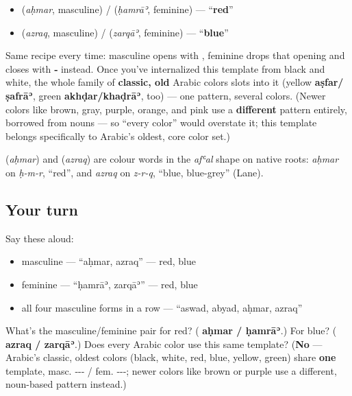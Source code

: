 \begin{grammarlens}[title={Grammar Lens — The pattern holds}]
\begin{itemize}
\raggedright
  \item \textbf{} (\emph{aḥmar}, masculine) / \textbf{} (\emph{ḥamrāʾ}, feminine) — \textquotedblleft{}\textbf{red}\textquotedblright{}
  \item \textbf{} (\emph{azraq}, masculine) / \textbf{} (\emph{zarqāʾ}, feminine) — \textquotedblleft{}\textbf{blue}\textquotedblright{}
\end{itemize}

Same recipe every time: masculine opens with \textbf{}, feminine drops that opening and closes with \textbf{‑} instead. Once you've internalized this template from black and white, the whole family of \textbf{classic, old} Arabic colors slots into it (yellow \textbf{aṣfar/ṣafrāʾ}, green \textbf{akhḍar/khaḍrāʾ}, too) — one pattern, several colors. (Newer colors like brown, gray, purple, orange, and pink use a \textbf{different} pattern entirely, borrowed from nouns — so \textquotedblleft{}every color\textquotedblright{} would overstate it; this template belongs specifically to Arabic's oldest, core color set.)
\end{grammarlens}

\begin{cousinweb}
\textbf{} (\emph{aḥmar}) and \textbf{} (\emph{azraq}) are colour words in the \emph{afʿal} shape on native roots: \emph{aḥmar} on \emph{ḥ-m-r}, \textquotedblleft{}red\textquotedblright{}, and \emph{azraq} on \emph{z-r-q}, \textquotedblleft{}blue, blue-grey\textquotedblright{} (Lane).
\end{cousinweb}

\subsection*{Your turn}
Say these aloud:

\begin{itemize}
\raggedright
  \item masculine — \textquotedblleft{}aḥmar, azraq\textquotedblright{} — red, blue
  \item feminine — \textquotedblleft{}ḥamrāʾ, zarqāʾ\textquotedblright{} — red, blue
  \item all four masculine forms in a row — \textquotedblleft{}aswad, abyad, aḥmar, azraq\textquotedblright{}
\end{itemize}

\begin{tcolorbox}[breakable,colback=teal!4,colframe=teal!35!black,title={Before you move on}]
What's the masculine/feminine pair for red? (\textbf{ aḥmar /  ḥamrāʾ}.) For blue? (\textbf{ azraq /  zarqāʾ}.) Does every Arabic color use this same template? (\textbf{No} — Arabic's classic, oldest colors (black, white, red, blue, yellow, green) share \textbf{one} template, masc. ‑‑‑ / fem. ‑‑‑; newer colors like brown or purple use a different, noun-based pattern instead.)
\end{tcolorbox}
